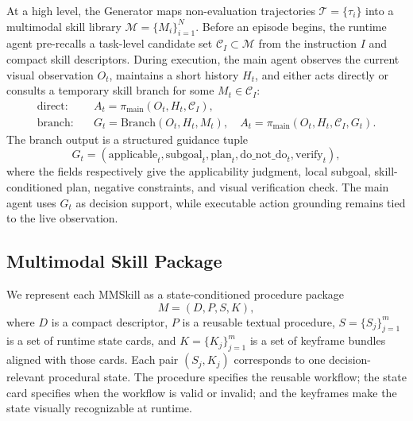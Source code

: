 At a high level, the Generator maps non-evaluation trajectories $\mathcal{T}=\{\tau_i\}$ into a multimodal skill library $\mathcal{M}=\{M_i\}_{i=1}^{N}$. Before an episode begins, the runtime agent pre-recalls a task-level candidate set $\mathcal{C}_I \subset \mathcal{M}$ from the instruction $I$ and compact skill descriptors. During execution, the main agent observes the current visual observation $O_t$, maintains a short history $H_t$, and either acts directly or consults a temporary skill branch for some $M_t\in\mathcal{C}_I$:
\begin{equation}
\begin{aligned}
\text{direct}: \quad
    & A_t = \pi_{\text{main}}(O_t,H_t,\mathcal{C}_I),\\
\text{branch}: \quad
    & G_t = \text{Branch}(O_t,H_t,M_t),\quad
      A_t = \pi_{\text{main}}(O_t,H_t,\mathcal{C}_I,G_t).
\end{aligned}
\label{eq:runtime-modes}
\end{equation}
The branch output is a structured guidance tuple
\begin{equation}
    G_t = (\text{applicable}_t,\text{subgoal}_t,\text{plan}_t,\text{do\_not\_do}_t,\text{verify}_t),
    \label{eq:branch-summary}
\end{equation}
where the fields respectively give the applicability judgment, local subgoal, skill-conditioned plan, negative constraints, and visual verification check. The main agent uses $G_t$ as decision support, while executable action grounding remains tied to the live observation.

\subsection{Multimodal Skill Package}
\label{sec:method-package}

We represent each MMSkill as a state-conditioned procedure package
\begin{equation}
    M=(D,P,S,K),
    \label{eq:mmskill}
\end{equation}
where $D$ is a compact descriptor, $P$ is a reusable textual procedure, $S=\{S_j\}_{j=1}^{m}$ is a set of runtime state cards, and $K=\{K_j\}_{j=1}^{m}$ is a set of keyframe bundles aligned with those cards. Each pair $(S_j,K_j)$ corresponds to one decision-relevant procedural state. The procedure specifies the reusable workflow; the state card specifies when the workflow is valid or invalid; and the keyframes make the state visually recognizable at runtime.

